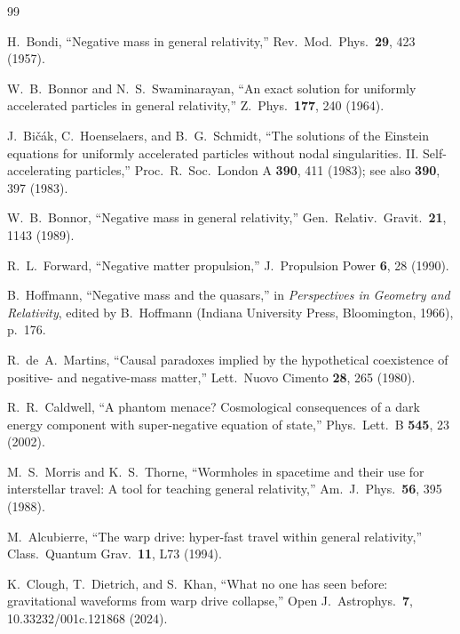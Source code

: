 \documentclass[twocolumn,floatfix,aps,prd,superscriptaddress,nofootinbib]{revtex4-2}
\begin{document}
\begin{thebibliography}{99}

H.~Bondi,
\newblock ``Negative mass in general relativity,''
\newblock Rev.\ Mod.\ Phys.\ \textbf{29}, 423 (1957).

W.~B.~Bonnor and N.~S.~Swaminarayan,
\newblock ``An exact solution for uniformly accelerated particles in general relativity,''
\newblock Z.\ Phys.\ \textbf{177}, 240 (1964).

J.~Bi\v{c}\'ak, C.~Hoenselaers, and B.~G.~Schmidt,
\newblock ``The solutions of the Einstein equations for uniformly accelerated particles without nodal singularities. II. Self-accelerating particles,''
\newblock Proc.\ R.\ Soc.\ London A \textbf{390}, 411 (1983); see also \textbf{390}, 397 (1983).

W.~B.~Bonnor,
\newblock ``Negative mass in general relativity,''
\newblock Gen.\ Relativ.\ Gravit.\ \textbf{21}, 1143 (1989).

R.~L.~Forward,
\newblock ``Negative matter propulsion,''
\newblock J.\ Propulsion Power \textbf{6}, 28 (1990).

B.~Hoffmann,
\newblock ``Negative mass and the quasars,''
\newblock in \emph{Perspectives in Geometry and Relativity}, edited by B.~Hoffmann (Indiana University Press, Bloomington, 1966), p.~176.

R.~de~A.~Martins,
\newblock ``Causal paradoxes implied by the hypothetical coexistence of positive- and negative-mass matter,''
\newblock Lett.\ Nuovo Cimento \textbf{28}, 265 (1980).

R.~R.~Caldwell,
\newblock ``A phantom menace? Cosmological consequences of a dark energy component with super-negative equation of state,''
\newblock Phys.\ Lett.\ B \textbf{545}, 23 (2002).

M.~S.~Morris and K.~S.~Thorne,
\newblock ``Wormholes in spacetime and their use for interstellar travel: A tool for teaching general relativity,''
\newblock Am.\ J.\ Phys.\ \textbf{56}, 395 (1988).

M.~Alcubierre,
\newblock ``The warp drive: hyper-fast travel within general relativity,''
\newblock Class.\ Quantum Grav.\ \textbf{11}, L73 (1994).

K.~Clough, T.~Dietrich, and S.~Khan,
\newblock ``What no one has seen before: gravitational waveforms from warp drive collapse,''
\newblock Open J.\ Astrophys.\ \textbf{7}, 10.33232/001c.121868 (2024).


\end{thebibliography}
\end{document}
